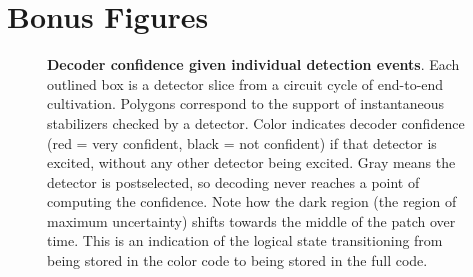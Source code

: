 \documentclass[onecolumn,unpublished,a4paper]{quantumarticle}
\theoremstyle{definition}
\begin{document}
\clearpage
\section{Bonus Figures}
\label{app:additional-figures}

\begin{figure}[H]
    \centering
    \begin{adjustwidth}{-2.5cm}{-2.5cm}
    \end{adjustwidth}
    \caption{
        \textbf{Decoder confidence given individual detection events}.
        Each outlined box is a detector slice from a circuit cycle of end-to-end cultivation.
        Polygons correspond to the support of instantaneous stabilizers checked by a detector.
        Color indicates decoder confidence (red = very confident, black = not confident) if that detector is excited, without any other detector being excited.
        Gray means the detector is postselected, so decoding never reaches a point of computing the confidence.
        Note how the dark region (the region of maximum uncertainty) shifts towards the middle of the patch over time.
        This is an indication of the logical state transitioning from being stored in the color code to being stored in the full code.
    }
    \label{fig:desaturation-gap}
\end{figure}
\end{document}
